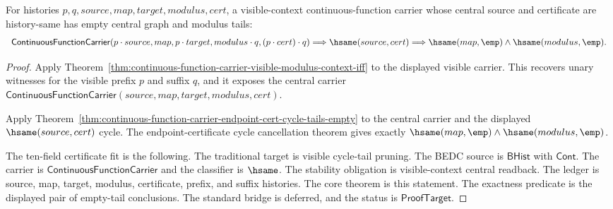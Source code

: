 \begin{theorem}
\label{thm:continuous-function-carrier-visible-modulus-context-cycle-tails-empty}
For histories $p,q,source,map,target,modulus,cert$, a visible-context
continuous-function carrier whose central source and certificate are
history-same has empty central graph and modulus tails:
$$
\begin{array}{l}
\mathsf{ContinuousFunctionCarrier}(p\cdot source,map,p\cdot target,
modulus\cdot q,(p\cdot cert)\cdot q)
\Longrightarrow
\hsame(source,cert)
\Longrightarrow
\hsame(map,\emp)\land\hsame(modulus,\emp).
\end{array}
$$
\end{theorem}
\begin{proof}
Apply Theorem~\ref{thm:continuous-function-carrier-visible-modulus-context-iff}
to the displayed visible carrier. This recovers unary witnesses for the visible
prefix $p$ and suffix $q$, and it exposes the central carrier
$\mathsf{ContinuousFunctionCarrier}(source,map,target,modulus,cert)$.

Apply
Theorem~\ref{thm:continuous-function-carrier-endpoint-cert-cycle-tails-empty}
to the central carrier and the displayed $\hsame(source,cert)$ cycle. The
endpoint-certificate cycle cancellation theorem gives exactly
$\hsame(map,\emp)\land\hsame(modulus,\emp)$.

The ten-field certificate fit is the following. The traditional target is
visible cycle-tail pruning. The BEDC source is $\mathsf{BHist}$ with
$\mathsf{Cont}$. The carrier is $\mathsf{ContinuousFunctionCarrier}$ and the
classifier is $\hsame$. The stability obligation is visible-context central
readback. The ledger is source, map, target, modulus, certificate, prefix, and
suffix histories. The core theorem is this statement. The exactness predicate is
the displayed pair of empty-tail conclusions. The standard bridge is deferred,
and the status is $\mathsf{ProofTarget}$.
\end{proof}

